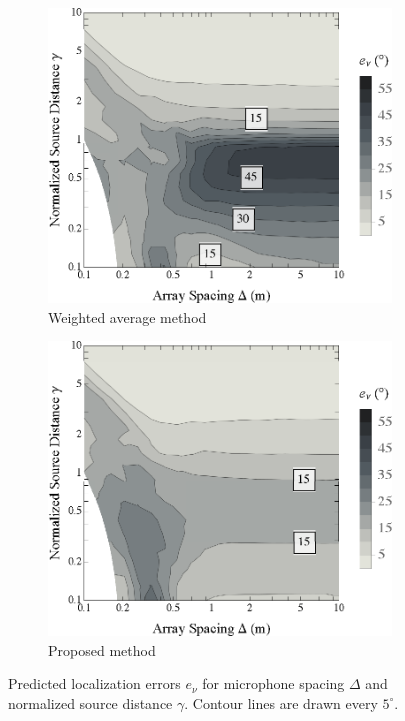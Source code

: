 \begin{figure}[t]
    	\centering
    	\begin{subfigure}[b]{0.49\textwidth}
        		\includegraphics[width=\textwidth]{08_proposed_method/figures/tylka2017_contour_xf.eps}
        		\caption{Weighted average method}
        		\label{fig:08_Proposed_Method:Localization_Errors:XF}
    	\end{subfigure}
	\hfill
	\begin{subfigure}[b]{0.49\textwidth}
        		\includegraphics[width=\textwidth]{08_proposed_method/figures/tylka2017_contour_validhybrid.eps}
        		\caption{Proposed method}
        		\label{fig:08_Proposed_Method:Localization_Errors:Hybrid}
    	\end{subfigure}
	
    	\caption[Contour plots of localization errors for each interpolation method.]{
	Predicted localization errors $e_\nu$ for microphone spacing $\Delta$ and normalized source distance $\gamma$.
  Contour lines are drawn every $5^\circ$.}
    	\label{fig:08_Proposed_Method:Localization_Errors}
\end{figure}


